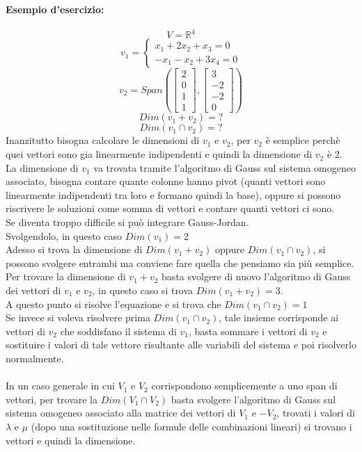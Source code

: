 \documentclass[12pt,a4paper]{article}
\begin{document}
\paragraph{Esempio d'esercizio:}
\[
V = \mathbb{R}^4
\]
\[
v_1 = \begin{cases}
  x_1 + 2x_2 + x_3 = 0\\
  -x_1 - x_2 + 3x_4 = 0
\end{cases}
\]
\[
v_2 = Span(\begin{bmatrix}
  2\\
  0\\
  1\\
  1
\end{bmatrix}, \begin{bmatrix}
  3\\
  -2\\
  -2\\
  0
\end{bmatrix})
\]
\[
Dim(v_1 + v_2) = ?
\]
\[
Dim(v_1 \cap v_2) = ?
\]
Inanzitutto bisogna calcolare le dimensioni di $v_1$ e $v_2$, per $v_2$ è semplice perchè quei vettori sono gia linearmente indipendenti e quindi la dimensione di $v_2$ è 2.\\
La dimensione di $v_1$ va trovata tramite l'algoritmo di Gauss sul sistema omogeneo associato, bisogna contare quante colonne hanno pivot (quanti vettori sono linearmente indipendenti tra loro e formano quindi la base), oppure si possono riscrivere le soluzioni come somma di vettori e contare quanti vettori ci sono.\\
Se diventa troppo difficile si può integrare Gauss-Jordan.\\
Svolgendolo, in questo caso $Dim(v_1) = 2$\\
Adesso si trova la dimensione di $Dim(v_1 + v_2)$ oppure $Dim(v_1 \cap v_2)$, si possono svolgere entrambi ma conviene fare quella che pensiamo sia più semplice.\\
Per trovare la dimensione di $v_1 + v_2$ basta svolgere di nuovo l'algoritmo di Gauss dei vettori di $v_1$ e $v_2$, in questo caso si trova $Dim(v_1 + v_2) = 3$.\\
A questo punto si risolve l'equazione e si trova che $Dim(v_1 \cap v_2) = 1$\\
Se invece si voleva risolvere prima $Dim(v_1 \cap v_2)$, tale insieme corrisponde ai vettori di $v_2$ che soddisfano il sistema di $v_1$, basta sommare i vettori di $v_2$ e sostituire i valori di tale vettore risultante alle variabili del sistema e poi risolverlo normalmente.\\\\
In un caso generale in cui $V_1$ e $V_2$ corrispondono semplicemente a uno span di vettori, per trovare la $Dim(V_1 \cap V_2)$ basta svolgere l'algoritmo di Gauss sul sistema omogeneo associato alla matrice dei vettori di $V_1$ e $-V_2$, trovati i valori di $\lambda$ e $\mu$ (dopo una sostituzione nelle formule delle combinazioni lineari) si trovano i vettori e quindi la dimensione.
\end{document}
